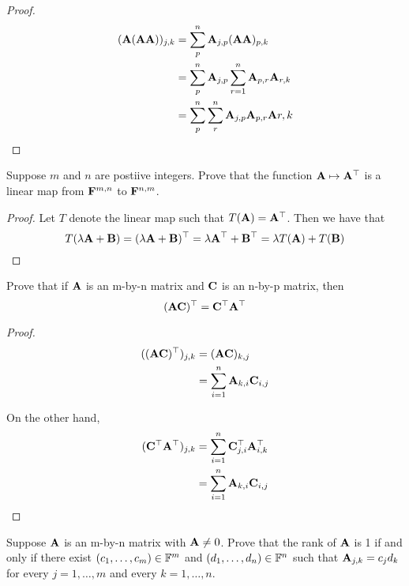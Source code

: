 \documentclass{extarticle}
\begin{document}
\begin{proof}

\begin{align*}
    (\mathbf{A} (\mathbf{A} \mathbf{A}))_{j, k }
    &= \sum_p^n \mathbf{A}_{j, p} (\mathbf{A} \mathbf{A})_{p, k} \\ 
    &= \sum_p^n \mathbf{A}_{j, p} \sum_{r=1}^{n} \mathbf{A}_{p, r} \mathbf{A}_{r, k} \\ 
    &= \sum_{p}^{n} \sum_r^n \mathbf{A}_{j, p} \mathbf{A}_{p, r} \mathbf{A}{r, k}
\end{align*}

\end{proof}


\begin{problem}{14}
    Suppose \(m\) and \(n\) are postiive integers. Prove that the function \(\mathbf{A} \mapsto \mathbf{A}^\top\)
    is a linear map from \(\mathbf{F}^{m, n}\) to \(\mathbf{F}^{n, m}\).  
\end{problem}

\begin{proof}
Let \(T\) denote the linear map such that \(T(\mathbf{A}) = \mathbf{A}^\top\). Then we have that 
\[T(\lambda \mathbf{A} + \mathbf{B}) = (\lambda \mathbf{A} + \mathbf{B})^\top = \lambda \mathbf{A}^\top + \mathbf{B}^\top = \lambda T(\mathbf{A}) + T(\mathbf{B})\]
\end{proof}

\begin{problem}{15}
    Prove that if \(\mathbf{A}\) is an m-by-n matrix and \(\mathbf{C}\) is an n-by-p matrix, then 
    \[(\mathbf{A} \mathbf{C})^\top = \mathbf{C}^\top \mathbf{A}^\top\] 
\end{problem}

\begin{proof}
\begin{align*}
    ((\mathbf{A} \mathbf{C})^\top)_{j, k}
    &= (\mathbf{A} \mathbf{C})_{k, j} \\ 
    &= \sum_{i=1}^{n} \mathbf{A}_{k, i} \mathbf{C}_{i, j}
\end{align*}

On the other hand, 
\begin{align*}
    (\mathbf{C}^\top \mathbf{A}^\top)_{j, k}
    &= \sum_{i=1}^{n} \mathbf{C}^\top_{j, i} \mathbf{A}_{i, k}^\top \\ 
    &= \sum_{i=1}^{n} \mathbf{A}_{k, i} \mathbf{C}_{i, j}
\end{align*}
\end{proof}


\begin{problem}{16}
    Suppose \(\mathbf{A}\) is an m-by-n matrix with \(\mathbf{A} \neq 0\). Prove that the rank of \(\mathbf{A}\)
    is 1 if and only if there exist \((c_1, \ldots, c_m) \in \mathbb{F}^m\) and 
    \((d_1, \ldots, d_n) \in \mathbb{F}^n\) such that \(\mathbf{A}_{j, k} = c_j d_k\)
    for every \(j = 1, \ldots, m\) and every \(k = 1, \ldots, n\). 
\end{problem}
\end{document}

